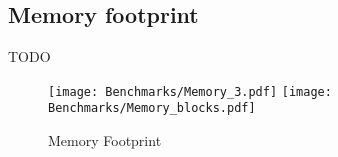 
\subsection{Memory footprint}
\color{red} TODO \color{black}

\begin{figure}[h!]
  \centering
  \texttt{[image: Benchmarks/Memory\_3.pdf]}
  \texttt{[image: Benchmarks/Memory\_blocks.pdf]}
  \label{MemoryFootprints}
  \caption{Memory Footprint}
\end{figure}



